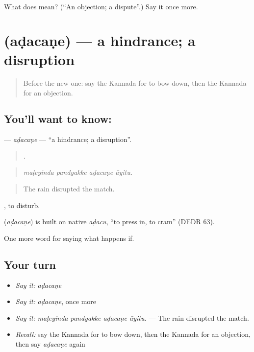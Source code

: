 \begin{tcolorbox}[breakable,colback=teal!4,colframe=teal!35!black,title={Before you move on}]
What does  mean? (\textquotedblleft{}An objection; a dispute\textquotedblright{}.) Say it once more.
\end{tcolorbox}
\section[\texorpdfstring{\kn{ಅಡಚಣೆ} (aḍacaṇe)}{ಅಡಚಣೆ (aḍacaṇe)}]{ (aḍacaṇe) — a hindrance; a disruption}

\label{lesson:KA-C432-adacane}



\begin{quote}
Before the new one: say the Kannada for to bow down, then the Kannada for an objection.
\end{quote}

\subsection*{You'll want to know: }
\textbf{} — \emph{aḍacaṇe} — \textquotedblleft{}a hindrance; a disruption\textquotedblright{}.

\begin{quote}
   .
\end{quote}

\begin{quote}
\emph{maḷeyinda pandyakke aḍacaṇe āyitu.}
\end{quote}

\begin{quote}
The rain disrupted the match.
\end{quote}

 , to disturb.

\begin{cousinweb}
\textbf{} (\emph{aḍacaṇe}) is built on native \emph{aḍacu}, \textquotedblleft{}to press in, to cram\textquotedblright{} (DEDR 63).
\end{cousinweb}

\begin{grammarlens}[title={What you've built}]
One more word for saying what happens if.
\end{grammarlens}

\subsection*{Your turn}
\begin{itemize}
\raggedright
  \item \emph{Say it:} \emph{aḍacaṇe}
  \item \emph{Say it:} \emph{aḍacaṇe}, once more
  \item \emph{Say it:} \emph{maḷeyinda pandyakke aḍacaṇe āyitu.} — The rain disrupted the match.
  \item \emph{Recall:} say the Kannada for to bow down, then the Kannada for an objection, then say \emph{aḍacaṇe} again
\end{itemize}

